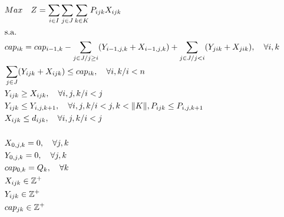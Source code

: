 \documentclass[10pt,a4paper]{article}
\begin{document}
\begin{align}
	 & Max \quad Z = \sum_{i\in I} \sum_{j\in J} \sum_{k\in K} P_{ijk} X_{ijk} \label{ecu1}                                                                & \\
	 & \text{s.a.}  \notag                                                                                                                                 & \\
	 & cap_{ik} = cap_{i-1,k} - \sum_{j\in J/j \geq i}(Y_{i-1,j,k} + X_{i-1,j,k}) + \sum_{j\in J /j<i}(Y_{jik} + X_{jik}), \quad \forall i,k  \label{ecu2} & \\
	 & \sum_{j \in J}(Y_{ijk} + X_{ijk}) \leq cap_{ik} , \quad \forall i,k/ i < n                                                \label{ecu3}              & \\
	 & Y_{ijk} \geq X_{ijk},  \quad \forall i,j,k/ i < j                                                                          \label{ecu4}             & \\
	 & Y_{ijk} \leq Y_{i,j,k+1},  \quad \forall i,j,k / i < j, k < \lVert K \rVert,  P_{ijk} \leq P_{i,j,k+1}                      \label{ecu5}            & \\
	 & X_{ijk} \leq d_{ijk},  \quad \forall i,j,k/ i < j                                                                           \label{ecu6}            & \\[15pt]
	 & X_{0,j,k} = 0,     \quad \forall j,k                                                                                        \label{ecu7}            & \\
	 & Y_{0,j,k} = 0,     \quad \forall j,k                                                                                        \label{ecu8}            & \\
	 & cap_{0,k} = Q_k,   \quad \forall k                                                                                          \label{ecu9}            & \\
	 & X_{ijk} \in \mathbb{Z}^+                                                                                                   \label{ecu10}           & \\
	 & Y_{ijk} \in \mathbb{Z}^+                                                                                                   \label{ecu11}           & \\
	 & cap_{jk} \in \mathbb{Z}^+                                                                                                   \label{ecu12}
\end{align}
\end{document}
